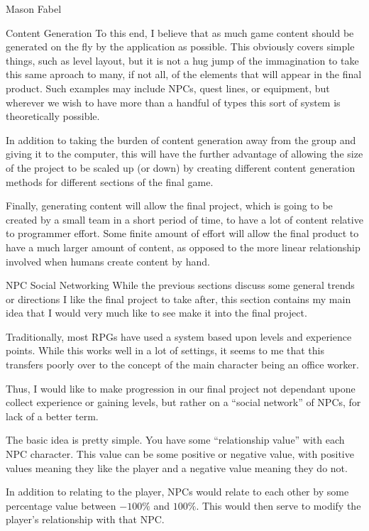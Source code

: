 \documentclass[12pt]{report}
\begin{document}
\begin{section}{Mason Fabel}
\begin{subsection}{Content Generation}
To this end, I believe that as much game content should be generated on the
fly by the application as possible. This obviously covers simple things,
such as level layout, but it is not a hug jump of the immagination to take
this same aproach to many, if not all, of the elements that will appear in
the final product. Such examples may include NPCs, quest lines, or
equipment, but wherever we wish to have more than a handful of types this
sort of system is theoretically possible.

In addition to taking the burden of content generation away from the group
and giving it to the computer, this will have the further advantage of
allowing the size of the project to be scaled up (or down) by creating
different content generation methods for different sections of the final
game.

Finally, generating content will allow the final project, which is going to
be created by a small team in a short period of time, to have a lot of
content relative to programmer effort. Some finite amount of effort will
allow the final product to have a much larger amount of content, as
opposed to the more linear relationship involved when humans create
content by hand.
\end{subsection}

\begin{subsection}{NPC Social Networking}
While the previous sections discuss some general trends or directions I
like the final project to take after, this section contains my main idea
that I would very much like to see make it into the final project.

Traditionally, most RPGs have used a system based upon levels and
experience points. While this works well in a lot of settings, it seems to
me that this transfers poorly over to the concept of the main character
being an office worker.

Thus, I would like to make progression in our final project not dependant
upone collect experience or gaining levels, but rather on a ``social
network'' of NPCs, for lack of a better term.

The basic idea is pretty simple. You have some ``relationship value''
with each NPC character. This value can be some positive or negative value,
with positive values meaning they like the player and a negative value
meaning they do not.

In addition to relating to the player, NPCs would relate to each other by
some percentage value between $-100\%$ and $100\%$. This would then serve
to modify the player's relationship with that NPC.


\end{subsection}
\end{section}
\end{document}
